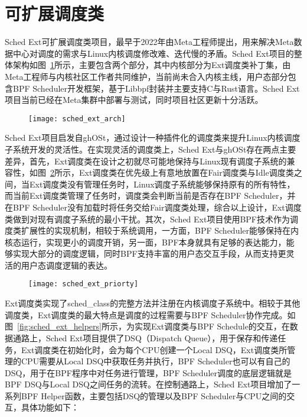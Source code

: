 \section{可扩展调度类}

Sched Ext可扩展调度类项目\citep{schedext}，最早于2022年由Meta工程师提出，用来解决Meta数据中心对调度的需求与Linux内核调度修改难、迭代慢的矛盾。Sched Ext项目的整体架构如图~\ref{fig:sched_ext_arch}所示，主要包含两个部分，其中内核部分为Ext调度类补丁集，由Meta工程师与内核社区工作者共同维护，当前尚未合入内核主线，用户态部分包含BPF Scheduler开发框架，基于Libbpf封装并主要支持C与Rust语言。Sched Ext项目当前已经在Meta集群中部署与测试，同时项目社区更新十分活跃。

\begin{figure}[!htbp]
    \centering
    \texttt{[image: sched\_ext\_arch]}
    \label{fig:sched_ext_arch}
\end{figure}

Sched Ext项目启发自ghOSt\citep{humphries2021ghost}，通过设计一种插件化的调度类来提升Linux内核调度子系统开发的灵活性。在实现灵活的调度类上，Sched Ext与ghOSt存在两点主要差异，首先，Ext调度类在设计之初就尽可能地保持与Linux现有调度子系统的兼容性，如图~\ref{fig:sched_ext_priorty}所示，Ext调度类在优先级上有意地放置在Fair调度类与Idle调度类之间，当Ext调度类没有管理任务时，Linux调度子系统能够保持原有的所有特性，而当前Ext调度类管理了任务时，调度类会判断当前是否存在BPF Scheduler，并在BPF Scheduler没有加载时将任务交给Fair调度类处理，综合以上设计，Ext调度类做到对现有调度子系统的最小干扰。其次，Sched Ext项目使用BPF技术作为调度类扩展性的实现机制，相较于系统调用，一方面，BPF Scheduler能够保持在内核态运行，实现更小的调度开销，另一面，BPF本身就具有足够的表达能力，能够实现大部分的调度逻辑，同时BPF支持丰富的用户态交互手段，从而支持更灵活的用户态调度逻辑的表达。

\begin{figure}[!htbp]
    \centering
    \texttt{[image: sched\_ext\_priorty]}
    \label{fig:sched_ext_priorty}
\end{figure}

Ext调度类实现了sched\_class的完整方法并注册在内核调度子系统中。相较于其他调度类，Ext调度类的最大特点是调度的过程需要与BPF Scheduler协作完成。如图~\ref{fig:sched_ext_helpers}所示，为实现Ext调度类与BPF Schedule的交互，在数据通路上，Sched Ext项目提供了DSQ（Dispatch Queue），用于保存和传递任务，Ext调度类在初始化时，会为每个CPU创建一个Local DSQ，Ext调度类所管理的CPU需要从Local DSQ中获取任务并执行，BPF Scheduler也可以有自己的DSQ，用于在BPF程序中对任务进行管理，BPF Scheduler调度的底层逻辑就是BPF DSQ与Local DSQ之间任务的流转。在控制通路上，Sched Ext项目增加了一系列BPF Helper函数，主要包括DSQ的管理以及BPF Scheduler与CPU之间的交互，具体功能如下：

